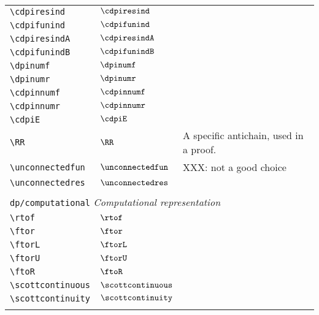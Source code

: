 \begin{longtable}{lll}
 {\color[rgb]{0.5,0.5,0.5}\texttt{\textbackslash cdpiresind}} & $\cdpiresind$ & \\ 
 {\color[rgb]{0.5,0.5,0.5}\texttt{\textbackslash cdpifunind}} & $\cdpifunind$ & \\ 
 {\color[rgb]{0.5,0.5,0.5}\texttt{\textbackslash cdpiresindA}} & $\cdpiresindA$ & \\ 
 {\color[rgb]{0.5,0.5,0.5}\texttt{\textbackslash cdpifunindB}} & $\cdpifunindB$ & \\ 
 {\color[rgb]{0.5,0.5,0.5}\texttt{\textbackslash dpinumf}} & $\dpinumf$ & \\ 
 {\color[rgb]{0.5,0.5,0.5}\texttt{\textbackslash dpinumr}} & $\dpinumr$ & \\ 
 {\color[rgb]{0.5,0.5,0.5}\texttt{\textbackslash cdpinnumf}} & $\cdpinnumf$ & \\ 
 {\color[rgb]{0.5,0.5,0.5}\texttt{\textbackslash cdpinnumr}} & $\cdpinnumr$ & \\ 
 {\color[rgb]{0.5,0.5,0.5}\texttt{\textbackslash cdpiE}} & $\cdpiE$ & \\ 
 {\color[rgb]{0.5,0.5,0.5}\texttt{\textbackslash RR}} & $\RR$ &  A specific antichain, used in a proof.\\ 
 {\color[rgb]{0.5,0.5,0.5}\texttt{\textbackslash unconnectedfun}} & $\unconnectedfun$ &  XXX: not a good choice\\ 
 {\color[rgb]{0.5,0.5,0.5}\texttt{\textbackslash unconnectedres}} & $\unconnectedres$ & \\ 
  &  & \\ 
 \multicolumn{3}{l}{{\color[rgb]{0.5,0.5,0.5}\texttt{dp/computational}} \emph{Computational representation}}\\ 
 \hline
{\color[rgb]{0.5,0.5,0.5}\texttt{\textbackslash rtof}} & $\rtof$ & \\ 
 {\color[rgb]{0.5,0.5,0.5}\texttt{\textbackslash ftor}} & $\ftor$ & \\ 
 {\color[rgb]{0.5,0.5,0.5}\texttt{\textbackslash ftorL}} & $\ftorL$ & \\ 
 {\color[rgb]{0.5,0.5,0.5}\texttt{\textbackslash ftorU}} & $\ftorU$ & \\ 
 {\color[rgb]{0.5,0.5,0.5}\texttt{\textbackslash ftoR}} & $\ftoR$ & \\ 
 {\color[rgb]{0.5,0.5,0.5}\texttt{\textbackslash scottcontinuous}} & $\scottcontinuous$ & \\ 
 {\color[rgb]{0.5,0.5,0.5}\texttt{\textbackslash scottcontinuity}} & $\scottcontinuity$ & \\ 
  &  & \\ 

\end{longtable}
